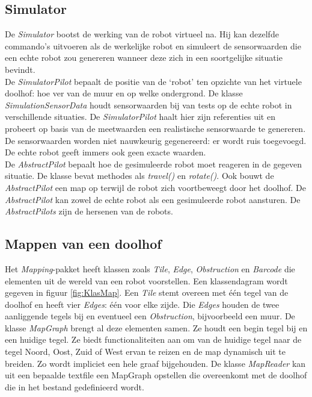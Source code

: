 \documentclass[tt2]{penoverslag}
\begin{document}
\subsection{Simulator}
\label{ssec:Sim}
De \textit{Simulator} bootst de werking van de robot virtueel na. Hij kan dezelfde commando's uitvoeren als de werkelijke robot en simuleert de sensorwaarden die een echte robot zou genereren wanneer deze zich in een soortgelijke situatie bevindt.\\

De \textit{SimulatorPilot} bepaalt de positie van de `robot' ten opzichte van het virtuele doolhof: hoe ver van de muur en op welke ondergrond. De klasse \textit{SimulationSensorData} houdt sensorwaarden bij van tests op de echte robot in verschillende situaties. De \textit{SimulatorPilot} haalt hier zijn referenties uit en probeert op basis van de meetwaarden een realistische sensorwaarde te genereren. De sensorwaarden worden niet nauwkeurig gegenereerd: er wordt ruis toegevoegd. De echte robot geeft immers ook geen exacte waarden.\\

De \textit{AbstractPilot} bepaalt hoe de gesimuleerde robot moet reageren in de gegeven situatie. De klasse bevat methodes als \textit{travel()} en \textit{rotate()}. Ook bouwt de \textit{AbstractPilot} een map op terwijl de robot zich voortbeweegt door het doolhof. De \textit{AbstractPilot} kan zowel de echte robot als een gesimuleerde robot aansturen. De \textit{AbstractPilots} zijn de hersenen van de robots.

\subsection{Mappen van een doolhof} %
\label{ssec:mapping}
Het \textit{Mapping}-pakket heeft klassen zoals \textit{Tile}, \textit{Edge}, \textit{Obstruction} en \textit{Barcode} die elementen uit de wereld van een robot voorstellen. Een klassendagram wordt gegeven in figuur \ref{fig:KlasMap}. Een \textit{Tile} stemt overeen met \'e\'en tegel van de doolhof en heeft vier \textit{Edges}: \'e\'en voor elke zijde. Die \textit{Edges} houden de twee aanliggende tegels bij en eventueel een \textit{Obstruction}, bijvoorbeeld een muur. De klasse \textit{MapGraph} brengt al deze elementen samen. Ze houdt een begin tegel bij en een huidige tegel. Ze biedt functionaliteiten aan om van de huidige tegel naar de tegel Noord, Oost, Zuid of West ervan te reizen en de map dynamisch uit te breiden. Zo wordt impliciet een hele graaf bijgehouden. De klasse \textit{MapReader} kan uit een bepaalde textfile een MapGraph opstellen die overeenkomt met de doolhof die in het bestand gedefinieerd wordt.\\
\end{document}

